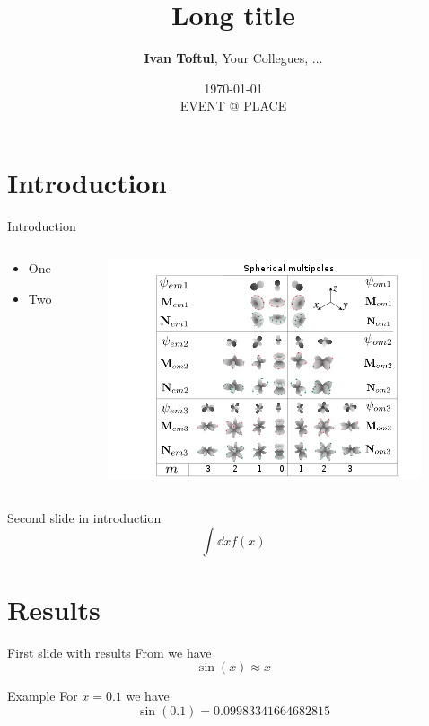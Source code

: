 \documentclass[
aspectratio=169,
16pt,
xcolor={dvipsnames} %
]{beamer}
\title[Short title]{\textbf{Long title}}
\author[Ivan Toftul]{
	\textbf{Ivan Toftul}, 
	Your Collegues, ...
}
\institute[ANU]{
	Australian National University \\ 
	\medskip
	\texttt{toftul.ivan@gmail.com} 
}
\date{
	\small{\today \\ EVENT @ PLACE}
}
\begin{document}
	
\begin{frame}
	\titlepage 
\end{frame}

\section{Introduction}

\begin{frame}[c]{Introduction}
	\begin{columns}
		\begin{column}{0.4\linewidth}
			\begin{itemize}
				\item One
				\item Two
			\end{itemize}
		\end{column}
		\begin{column}{0.6\linewidth}
			\begin{figure}
				\includegraphics[width=1.0\linewidth]{fig/VSHwiki}
			\end{figure}
		\end{column}
	\end{columns}
\end{frame}

\begin{frame}[c]{Second slide in introduction}
	\[
		\int \dd x f(x)
	\]
\end{frame}



\section{Results}
\begin{frame}[c]{First slide with results}
	From  we have
	\[
		\sin(x) \approx x
	\]
	\begin{block}{Example}
		For $x = 0.1$ we have 
		\[
			\sin (0.1) = 0.09983341664682815
		\]
	\end{block}
\end{frame}
\end{document}
